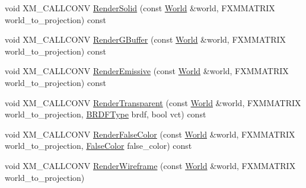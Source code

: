 \begin{DoxyCompactItemize}
\item 
void X\+M\+\_\+\+C\+A\+L\+L\+C\+O\+NV \hyperlink{classmage_1_1rendering_1_1_forward_pass_a7e473c7597d2b725cea68fa74fe20b56}{Render\+Solid} (const \hyperlink{classmage_1_1rendering_1_1_world}{World} \&world, F\+X\+M\+M\+A\+T\+R\+IX world\+\_\+to\+\_\+projection) const
\item 
void X\+M\+\_\+\+C\+A\+L\+L\+C\+O\+NV \hyperlink{classmage_1_1rendering_1_1_forward_pass_aaf7698f452eab9c6cb7cbc07b8991d5b}{Render\+G\+Buffer} (const \hyperlink{classmage_1_1rendering_1_1_world}{World} \&world, F\+X\+M\+M\+A\+T\+R\+IX world\+\_\+to\+\_\+projection) const
\item 
void X\+M\+\_\+\+C\+A\+L\+L\+C\+O\+NV \hyperlink{classmage_1_1rendering_1_1_forward_pass_ac272e648126ed4dc8386edddfc18cc76}{Render\+Emissive} (const \hyperlink{classmage_1_1rendering_1_1_world}{World} \&world, F\+X\+M\+M\+A\+T\+R\+IX world\+\_\+to\+\_\+projection) const
\item 
void X\+M\+\_\+\+C\+A\+L\+L\+C\+O\+NV \hyperlink{classmage_1_1rendering_1_1_forward_pass_a63f8338410a6fe42f5333239dd6bdc74}{Render\+Transparent} (const \hyperlink{classmage_1_1rendering_1_1_world}{World} \&world, F\+X\+M\+M\+A\+T\+R\+IX world\+\_\+to\+\_\+projection, \hyperlink{namespacemage_1_1rendering_a13c5e70586af4ce254146074ec055bf6}{B\+R\+D\+F\+Type} brdf, bool vct) const
\item 
void X\+M\+\_\+\+C\+A\+L\+L\+C\+O\+NV \hyperlink{classmage_1_1rendering_1_1_forward_pass_ae18018111470a84e9313f11c72cc3326}{Render\+False\+Color} (const \hyperlink{classmage_1_1rendering_1_1_world}{World} \&world, F\+X\+M\+M\+A\+T\+R\+IX world\+\_\+to\+\_\+projection, \hyperlink{namespacemage_1_1rendering_a6c3d1f4e7a5ae72dc07226e971205534}{False\+Color} false\+\_\+color) const
\item 
void X\+M\+\_\+\+C\+A\+L\+L\+C\+O\+NV \hyperlink{classmage_1_1rendering_1_1_forward_pass_a1d6bbef579e996ffc34d25b29dd3ffef}{Render\+Wireframe} (const \hyperlink{classmage_1_1rendering_1_1_world}{World} \&world, F\+X\+M\+M\+A\+T\+R\+IX world\+\_\+to\+\_\+projection)
\end{DoxyCompactItemize}

